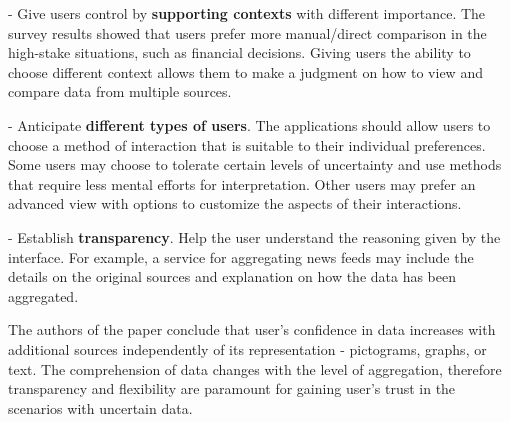 \documentclass[12pt,letterpaper]{article}
\begin{document}
\hspace{10mm} - Give users control by \textbf{supporting contexts} with different importance. The survey results showed that users prefer more manual/direct comparison in the high-stake situations, such as financial decisions. Giving users the ability to choose different context allows them to make a judgment on how to view and compare data from multiple sources.  

\hspace{10mm} - Anticipate \textbf{different types of users}. The applications should allow users to choose a method of interaction that is suitable to their individual preferences. Some users may choose to tolerate certain levels of uncertainty and use methods that require less mental efforts for interpretation. Other users may prefer an advanced view with options to customize the aspects of their interactions. 

\hspace{10mm} - Establish \textbf{transparency}. Help the user understand the reasoning given by the interface. For example, a service for aggregating news feeds may include the details on the original sources and explanation on how the data has been aggregated. 

The authors of the paper conclude that user's confidence in data increases with additional sources independently of its representation - pictograms, graphs, or text. The comprehension of data changes with the level of aggregation, therefore transparency and flexibility are paramount for gaining user's trust in the scenarios with uncertain data. 

 

\end{document}
